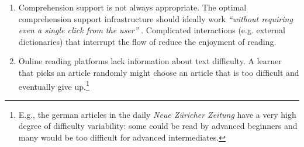 \begin{enumerate}
	

  \item Comprehension support is not always appropriate. The optimal comprehension support infrastructure should ideally work {\em ``without requiring even a single click from the user''} \cite{Proszeky02-Comprehension}. 
  Complicated interactions (e.g. external dictionaries) that interrupt the flow of reduce the enjoyment of reading.
  

  \item Online reading platforms lack information about text difficulty. A learner that picks an article randomly might choose an article that is too difficult and eventually give up.\footnote{E.g., the german articles in the  daily {\em Neue Z\"uricher Zeitung} have a very high degree of difficulty variability: some could be read by advanced beginners and many would be too difficult for advanced intermediates.}

  
\end{enumerate}





	
	






